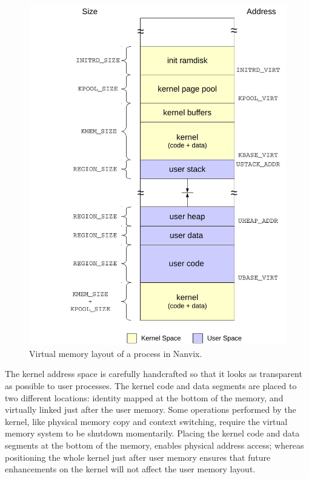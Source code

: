 \documentclass[10pt,a4paper]{article}
\begin{document}
\begin{figure}[!b]
	\centering
	\includegraphics[scale=0.60]{img/memory-layout}
	\caption{Virtual memory layout of a process in Nanvix.}
	\label{figure: virtual memory layout}
\end{figure}

The kernel address space is carefully handcrafted so that it looks as transparent as possible to user processes. The kernel code and data segments are placed to two different locations: identity mapped at the bottom of the memory, and virtually linked just after the user memory. Some operations performed by the kernel, like physical memory copy and context switching, require the virtual memory system to be shutdown momentarily. Placing the kernel code and data segments at the bottom of the memory, enables physical address access; whereas positioning the whole kernel just after user memory ensures that future enhancements on the kernel will not affect the user memory layout.
\end{document}

